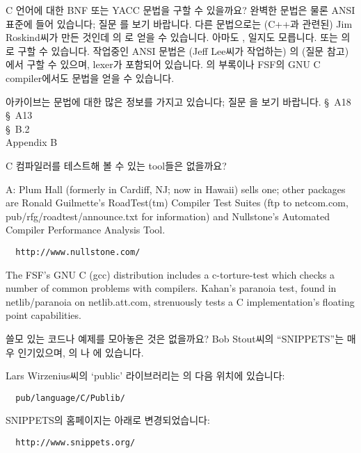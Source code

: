 \begin{faq}
	C 언어에 대한 BNF 또는 YACC 문법을 구할 수 있을까요?
\A
	완벽한 문법은 물론 ANSI 표준에 들어 있습니다; 질문 를
	보기 바랍니다.  다른 문법으로는 (C++과 관련된) Jim Roskind씨가
	만든 것인데 의 로
	얻을 수 있습니다.  아마도 ,
	일지도 모릅니다.  또는
	의 로 구할 수
	있습니다.
	작업중인 ANSI 문법은 (Jeff Lee씨가 작업하는) 의
	(질문  참고) 에서
	구할 수 있으며, lexer가 포함되어 있습니다.
	\cite{kr2}의 부록이나 FSF의 GNU C compiler에서도 문법을 얻을 수 있습니다.

	 아카이브는 문법에 대한 많은 정보를 가지고
	있습니다; 질문 을 보기 바랍니다.
\R
	\cite{kr1} \S\ A18  \\
	\cite{kr2} \S\ A13  \\
	\cite{c89} \S\ B.2 \\
	\cite{hs}  Appendix B
\end{faq}

\begin{faq}
	C 컴파일러를 테스트해 볼 수 있는 tool들은 없을까요?

\A
A:	Plum Hall (formerly in Cardiff, NJ; now in Hawaii) sells one;
	other packages are Ronald Guilmette's RoadTest(tm) Compiler Test
	Suites (ftp to netcom.com, pub/rfg/roadtest/announce.txt for
	information) and Nullstone's Automated Compiler Performance
	Analysis Tool.
\begin{verbatim}
  http://www.nullstone.com/
\end{verbatim}
	\noindent The FSF's GNU C
	(gcc) distribution includes a c-torture-test which checks a
	number of common problems with compilers.   Kahan's paranoia
	test, found in netlib/paranoia on netlib.att.com, strenuously
	tests a C implementation's floating point capabilities.

\end{faq}


\begin{faq}
	쓸모 있는 코드나 예제를 모아놓은 것은 없을까요?
\A
	Bob Stout씨의 ``SNIPPETS''는 매우 인기있으며,
	의 나 
	에 있습니다.

	Lars Wirzenius씨의 `public' 라이브러리는 의
        다음 위치에 있습니다:
\begin{verbatim}
  pub/language/C/Publib/
\end{verbatim}
	\noindent {}

\T
	SNIPPETS의 홈페이지는 아래로 변경되었습니다:
\begin{verbatim}
  http://www.snippets.org/
\end{verbatim}


\end{faq}

